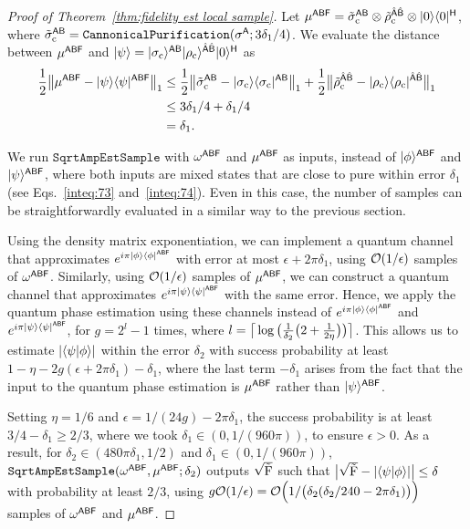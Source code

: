 \begin{proof}[Proof of Theorem~\ref{thm:fidelity est local sample}]
Let $\mu^{{\mathsf{A}}{\mathsf{B}}{\mathsf{F}}} = \tilde{\sigma}_{\rm c}^{{\mathsf{A}}{\mathsf{B}}}\otimes\tilde{\rho}_{\rm c}^{\hat{{\mathsf{A}}}\hat{{\mathsf{B}}}}\otimes|0\rangle\langle0|^{{\mathsf{H}}}$, where $\tilde{\sigma}_{\rm c}^{{\mathsf{A}}{\mathsf{B}}} = \mathtt{CannonicalPurification}(\sigma^{\mathsf{A}}; 3\delta_1/4)$.
We evaluate the distance between $\mu^{{\mathsf{A}}{\mathsf{B}}{\mathsf{F}}}$ and $|\psi\rangle = |\sigma_{\rm c}\rangle^{{\mathsf{A}}{\mathsf{B}}}|\rho_{\rm c}\rangle^{\hat{{\mathsf{A}}}\hat{{\mathsf{B}}}}|0\rangle^{{\mathsf{H}}}$ as
\begin{align}
    \frac{1}{2}\big\|\mu^{{\mathsf{A}}{\mathsf{B}}{\mathsf{F}}} - |\psi\rangle\langle\psi|^{{\mathsf{A}}{\mathsf{B}}{\mathsf{F}}}\big\|_1
    &\leq \frac{1}{2}\big\|\tilde{\sigma}_{\rm c}^{{\mathsf{A}}{\mathsf{B}}} - |\sigma_{\rm c}\rangle\langle\sigma_{\rm c}|^{{\mathsf{A}}{\mathsf{B}}}\big\|_1 + \frac{1}{2}\big\|\tilde{\rho}_{\rm c}^{\hat{{\mathsf{A}}}\hat{{\mathsf{B}}}} - |\rho_{\rm c}\rangle\langle\rho_{\rm c}|^{\hat{{\mathsf{A}}}\hat{{\mathsf{B}}}}\big\|_1 \\
    &\leq 3\delta_1/4 + \delta_1/4 \\
    \label{inteq:74}
    &= \delta_1.
\end{align}


We run $\mathtt{SqrtAmpEstSample}$ with $\omega^{{\mathsf{A}}{\mathsf{B}}{\mathsf{F}}}$ and $\mu^{{\mathsf{A}}{\mathsf{B}}{\mathsf{F}}}$ as inputs, instead of $|\phi\rangle^{{\mathsf{A}}{\mathsf{B}}{\mathsf{F}}}$ and $|\psi\rangle^{{\mathsf{A}}{\mathsf{B}}{\mathsf{F}}}$,  where both inputs are mixed states that are close to pure within error $\delta_1$ (see Eqs.~\eqref{inteq:73} and~\eqref{inteq:74}).
Even in this case, the number of samples can be straightforwardly evaluated in a similar way to the previous section.



Using the density matrix exponentiation, we can implement a quantum channel that approximates $e^{i\pi|\phi\rangle\langle\phi|^{{\mathsf{A}}{\mathsf{B}}{\mathsf{F}}}}$ with error at most $\epsilon + 2\pi\delta_1$, using ${\mathcal{O}}(1/\epsilon)$ samples of $\omega^{{\mathsf{A}}{\mathsf{B}}{\mathsf{F}}}$.
Similarly, using ${\mathcal{O}}(1/\epsilon)$ samples of $\mu^{{\mathsf{A}}{\mathsf{B}}{\mathsf{F}}}$, we can construct a quantum channel that approximates $e^{i\pi|\psi\rangle\langle\psi|^{{\mathsf{A}}{\mathsf{B}}{\mathsf{F}}}}$ with the same error.
Hence, we apply the quantum phase estimation using these channels instead of
$e^{i\pi|\phi\rangle\langle\phi|^{{\mathsf{A}}{\mathsf{B}}{\mathsf{F}}}}$ and $e^{i\pi|\psi\rangle\langle\psi|^{{\mathsf{A}}{\mathsf{B}}{\mathsf{F}}}}$,
for $g = 2^l - 1$ times, where
$l = \big\lceil\log{\big(\frac{1}{\delta_2}\big(2 + \frac{1}{2\eta}\big)}\big)\big\rceil$.
This allows us to estimate $|\langle \psi \vert \phi \rangle|$ within the error $\delta_2$ with success probability at least
$1 - \eta - 2g(\epsilon + 2\pi\delta_1) - \delta_1$,
where the last term $-\delta_1$ arises from the fact that the input to the quantum phase estimation is $\mu^{{\mathsf{A}}{\mathsf{B}}{\mathsf{F}}}$ rather than $|\psi\rangle^{{\mathsf{A}}{\mathsf{B}}{\mathsf{F}}}$.

Setting $\eta = 1/6$ and $\epsilon = 1/(24g) - 2\pi \delta_1$, the success probability is at least $3/4 - \delta_1 \geq 2/3$, where we took $\delta_1 \in (0, 1/(960\pi))$, to ensure $\epsilon >0$.
As a result, for $\delta_2 \in (480\pi\delta_1, 1/2)$ and $\delta_1 \in (0, 1/(960\pi))$, $\mathtt{SqrtAmpEstSample}(\omega^{{\mathsf{A}}{\mathsf{B}}{\mathsf{F}}}, \mu^{{\mathsf{A}}{\mathsf{B}}{\mathsf{F}}}; \delta_2)$ outputs $\sqrt{\tilde{{\mathrm{F}}}}$ such that $\big|\sqrt{\tilde{{\mathrm{F}}}} - |\langle \psi \vert \phi \rangle|\big| \leq \delta$ with probability at least $2/3$, using $g{\mathcal{O}}(1/\epsilon) = {\mathcal{O}}\Big(1/\big(\delta_2(\delta_2/240 - 2\pi \delta_1)\big)\Big)$ samples of $\omega^{{\mathsf{A}}{\mathsf{B}}{\mathsf{F}}}$ and $\mu^{{\mathsf{A}}{\mathsf{B}}{\mathsf{F}}}$.



\end{proof}

